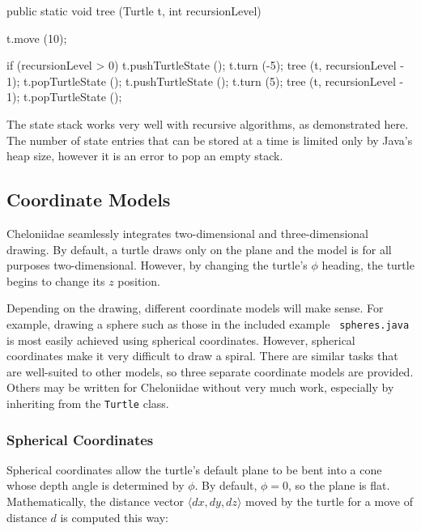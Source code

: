 \documentclass{article}
\begin{document}
      \lstset{gobble=8}
      \begin{java}
	public static void tree (Turtle t, int recursionLevel) {
	  t.move (10);

	  if (recursionLevel > 0) {
	    t.pushTurtleState ();
	    t.turn (-5);
	    tree (t, recursionLevel - 1);
	    t.popTurtleState ();
	    t.pushTurtleState ();
	    t.turn (5);
	    tree (t, recursionLevel - 1);
	    t.popTurtleState ();
	  }
	}
      \end{java}
      
      The state stack works very well with recursive algorithms, as demonstrated
      here. The number of state entries that can be stored at a time is limited
      only by Java's heap size, however it is an error to pop an empty stack.

    \subsection{Coordinate Models}
      \label{sec:coordinate-models}

      Cheloniidae seamlessly integrates two-dimensional and three-dimensional
      drawing. By default, a turtle draws only on the plane and the model is for
      all purposes two-dimensional. However, by changing the turtle's $\phi$
      heading, the turtle begins to change its $z$ position.

      Depending on the drawing, different coordinate models will make sense. For
      example, drawing a sphere such as those in the included example {\tt
      spheres.java} is most easily achieved using spherical coordinates. However,
      spherical coordinates make it very difficult to draw a spiral. There are
      similar tasks that are well-suited to other models, so three separate
      coordinate models are provided. Others may be written for Cheloniidae without
      very much work, especially by inheriting from the {\tt Turtle} class.

      \subsubsection{Spherical Coordinates}
	\label{sec:z-spherical}
	\label{sec:spherical-coordinates}

	Spherical coordinates allow the turtle's default plane to be bent into a
	cone whose depth angle is determined by $\phi$. By default, $\phi=0$, so
	the plane is flat. Mathematically, the distance vector $\langle dx, dy,
	dz\rangle$ moved by the turtle for a move of distance $d$ is computed
	this way:
\end{document}
